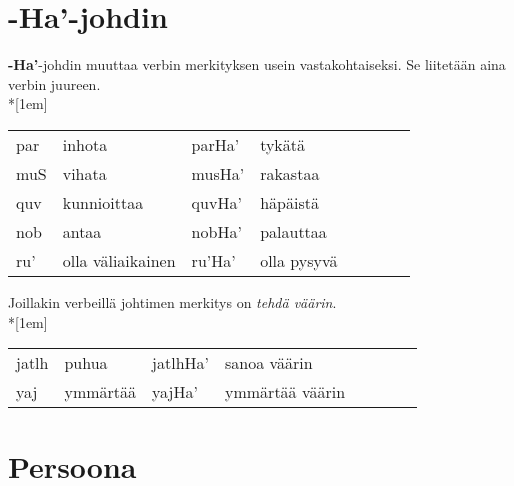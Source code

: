 \documentclass{book}
\begin{document}
\section{-Ha'-johdin}

\textbf{-Ha'}-johdin muuttaa verbin merkityksen usein vastakohtaiseksi.
Se liitetään aina verbin juureen.\\*[1em]
\begin{tabular}{Bl Il | Bl Il}
    par & inhota & parHa' & tykätä \\
    muS & vihata & musHa' & rakastaa \\
    quv & kunnioittaa & quvHa' & häpäistä \\
    nob & antaa & nobHa' & palauttaa \\
    ru' & olla väliaikainen & ru'Ha' & olla pysyvä \\
\end{tabular}

Joillakin verbeillä johtimen merkitys on \textit{tehdä väärin}.\\*[1em]
\begin{tabular}{Bl Il | Bl Il}
    jatlh & puhua & jatlhHa' & sanoa väärin \\
    yaj & ymmärtää & yajHa' & ymmärtää väärin \\
\end{tabular}

\section{Persoona}
\end{document}
